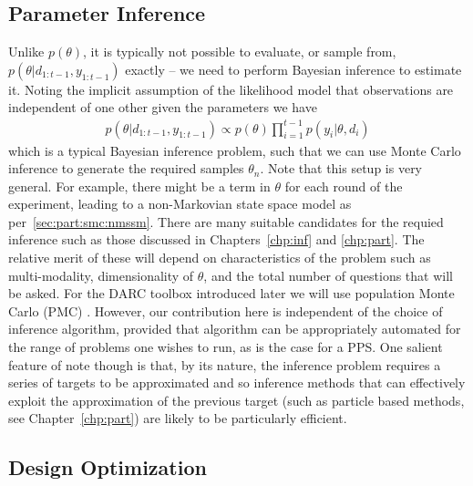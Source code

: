 \subsection{Parameter Inference}
\label{sec:design:auto:inf}

Unlike $p\left(\theta\right)$, it is typically not possible to evaluate, or sample from, $p\left(\theta | d_{1:t-1}, y_{1:t-1}\right)$ exactly -- we need to perform Bayesian inference to estimate it.  Noting
the implicit assumption of the likelihood model that observations are independent of one other given the
parameters we have
\begin{align}
p\left(\theta | d_{1:t-1}, y_{1:t-1}\right) \propto p(\theta) \prod_{i=1}^{t-1} p(y_i | \theta, d_i)
\end{align}
which is a typical Bayesian inference problem, such that we can use Monte Carlo inference
to generate the required samples $\theta_n$.  Note that this setup is very general.   For example, there might
be a term in $\theta$ for each round of the experiment, leading to a non-Markovian state space model as
per~\ref{sec:part:smc:nmssm}.
There are many suitable candidates for the requied inference such as those discussed in Chapters~\ref{chp:inf} and
\ref{chp:part}.
The relative merit of these will depend on
characteristics of the problem such as multi-modality, dimensionality of $\theta$, and the total
number of questions that will be asked.  For the DARC toolbox introduced later we will use 
population Monte Carlo (PMC) \citep{cappe2004population}.  However, our contribution here is independent of
the choice of inference algorithm, provided that algorithm can be appropriately automated for the range
of problems one wishes to run, as is the case for a PPS.  One salient feature of note though is
that, by its nature, the inference problem requires a series of targets to be approximated and so
inference methods that can effectively exploit the approximation of the previous target (such as particle
based methods, see Chapter~\ref{chp:part}) are likely to be particularly efficient.

\subsection{Design Optimization}
\label{sec:design:auto:optimization}

